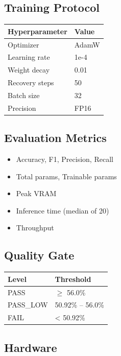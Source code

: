 \subsection{Training Protocol}

\begin{table}[H]
\centering
\small
\begin{tabular}{ll}
\toprule
\textbf{Hyperparameter} & \textbf{Value} \\
\midrule
Optimizer & AdamW \\
Learning rate & 1e-4 \\
Weight decay & 0.01 \\
Recovery steps & 50 \\
Batch size & 32 \\
Precision & FP16 \\
\bottomrule
\end{tabular}
\end{table}

\subsection{Evaluation Metrics}

\begin{itemize}
\item Accuracy, F1, Precision, Recall
\item Total params, Trainable params
\item Peak VRAM
\item Inference time (median of 20)
\item Throughput

\end{itemize}
\subsection{Quality Gate}

\begin{table}[H]
\centering
\small
\begin{tabular}{ll}
\toprule
\textbf{Level} & \textbf{Threshold} \\
\midrule
PASS & $\ge$ 56.0\% \\
PASS\_LOW & 50.92\% -- 56.0\% \\
FAIL & \textless{} 50.92\% \\
\bottomrule
\end{tabular}
\end{table}

\subsection{Hardware}

